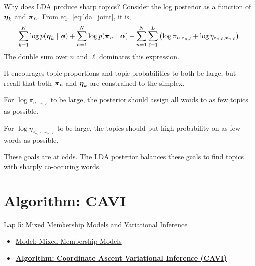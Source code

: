 \documentclass[aspectratio=169]{beamer}
\begin{document}
\begin{frame}{Why does LDA produce sharp topics?}
Consider the log posterior as a function of $\boldsymbol{\eta}_k$ and $\boldsymbol{\pi}_n$. From eq.~\ref{eq:lda_joint}, it is,
\begin{align}
    \sum_{k=1}^K \log p(\boldsymbol{\eta}_k ~\vert~ \boldsymbol{\phi}) + \sum_{n=1}^N \log p(\boldsymbol{\pi}_n ~\vert~ \boldsymbol{\alpha}) + \sum_{n=1}^N \sum_{\ell=1}^L \left( \log \pi_{n, z_{n, \ell}} + \log \eta_{z_{n, \ell}, x_{n, \ell}} \right)
\end{align}
The double sum over $n$ and $\ell$ dominates this expression.

It encourages topic proportions and topic probabilities to both be large, but recall that both $\boldsymbol{\pi}_n$ and $\boldsymbol{\eta}_k$ are constrained to the simplex.

For $\log \pi_{n,z_{n,\ell}}$ to be large, the posterior should assign all words to as few topics as possible. 

For $\log \eta_{z_{n,\ell}, x_{n, \ell}}$ to be large, the topics should put high probability on as few words as possible.

These goals are at odds. The LDA posterior balances these goals to find topics with sharply co-occuring words.

\end{frame}


    

\section{Algorithm: CAVI}
\label{sec:cavi}

\begin{frame}{Lap 5: Mixed Membership Models and Variational Inference}
\begin{itemize}
    \item \hyperref[sec:models]{Model: Mixed Membership Models}
    \item \hyperref[sec:cavi]{\textbf{Algorithm: Coordinate Ascent Variational Inference (CAVI)}}
\end{itemize}
\end{frame}
\end{document}

